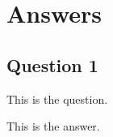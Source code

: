 \chapter{Answers}
\label{cp:answers}
\section{Question 1}
\begin{importantbox}
    This is the question.
\end{importantbox}
\noindent{}This is the answer.